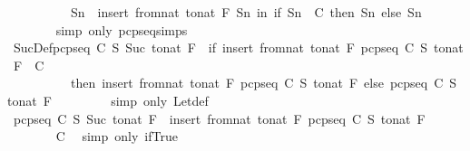 \begin{isabellebody}
\ \ \ \ \ \ \ \ \ \ Sn{}\ {\isacharequal}\ insert\ {\isacharparenleft}from{\isacharunderscore}nat\ {\isacharparenleft}to{\isacharunderscore}nat\ F{\isacharparenright}{\isacharparenright}\ Sn\ in\ if\ Sn{}\ {\isasymin}\ C\ then\ Sn{}\ else\ Sn{\isacharparenright}{\isachardoublequoteclose}\ \isanewline
\ \ \ \ \ \ \isamarkupfalse%
\ {\isacharparenleft}simp\ only{\isacharcolon}\ pcp{\isacharunderscore}seq{\isachardot}simps{\isacharparenleft}{}{\isacharparenright}{\isacharparenright}\isanewline
\ \ \ \ \isamarkupfalse%
\ \isamarkupfalse%
\ SucDef{\isacharcolon}{\isachardoublequoteopen}pcp{\isacharunderscore}seq\ C\ S\ {\isacharparenleft}Suc\ {\isacharparenleft}to{\isacharunderscore}nat\ F{\isacharparenright}{\isacharparenright}\ {\isacharequal}\ {\isacharparenleft}if\ insert\ {\isacharparenleft}from{\isacharunderscore}nat\ {\isacharparenleft}to{\isacharunderscore}nat\ F{\isacharparenright}{\isacharparenright}\ {\isacharparenleft}pcp{\isacharunderscore}seq\ C\ S\ {\isacharparenleft}to{\isacharunderscore}nat\ F{\isacharparenright}{\isacharparenright}\ {\isasymin}\ C\ \isanewline
\ \ \ \ \ \ \ \ \ \ then\ insert\ {\isacharparenleft}from{\isacharunderscore}nat\ {\isacharparenleft}to{\isacharunderscore}nat\ F{\isacharparenright}{\isacharparenright}\ {\isacharparenleft}pcp{\isacharunderscore}seq\ C\ S\ {\isacharparenleft}to{\isacharunderscore}nat\ F{\isacharparenright}{\isacharparenright}\ else\ pcp{\isacharunderscore}seq\ C\ S\ {\isacharparenleft}to{\isacharunderscore}nat\ F{\isacharparenright}{\isacharparenright}{\isachardoublequoteclose}\ \isanewline
\ \ \ \ \ \ \isamarkupfalse%
\ {\isacharparenleft}simp\ only{\isacharcolon}\ Let{\isacharunderscore}def{\isacharparenright}\isanewline
\ \ \ \ \isamarkupfalse%
\ \isamarkupfalse%
\ {\isachardoublequoteopen}pcp{\isacharunderscore}seq\ C\ S\ {\isacharparenleft}Suc\ {\isacharparenleft}to{\isacharunderscore}nat\ F{\isacharparenright}{\isacharparenright}\ {\isacharequal}\ insert\ {\isacharparenleft}from{\isacharunderscore}nat\ {\isacharparenleft}to{\isacharunderscore}nat\ F{\isacharparenright}{\isacharparenright}\ {\isacharparenleft}pcp{\isacharunderscore}seq\ C\ S\ {\isacharparenleft}to{\isacharunderscore}nat\ F{\isacharparenright}{\isacharparenright}{\isachardoublequoteclose}\ \isanewline
\ \ \ \ \ \ \isamarkupfalse%
\ C\ \isamarkupfalse%
\ {\isacharparenleft}simp\ only{\isacharcolon}\ if{\isacharunderscore}True{\isacharparenright}\isanewline

\end{isabellebody}
